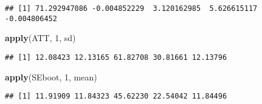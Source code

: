 \documentclass[]{article}
\newenvironment{Shaded}{\begin{snugshade}}{\end{snugshade}}
\newcommand{\KeywordTok}[1]{\textcolor[rgb]{0.13,0.29,0.53}{\textbf{#1}}}
\newcommand{\DecValTok}[1]{\textcolor[rgb]{0.00,0.00,0.81}{#1}}
\newcommand{\NormalTok}[1]{#1}
\begin{document}
\begin{verbatim}
## [1] 71.292947086 -0.004852229  3.120162985  5.626615117 -0.004806452
\end{verbatim}

\begin{Shaded}
\begin{Highlighting}[]
\KeywordTok{apply}\NormalTok{(ATT, }\DecValTok{1}\NormalTok{, sd)}
\end{Highlighting}
\end{Shaded}

\begin{verbatim}
## [1] 12.08423 12.13165 61.82708 30.81661 12.13796
\end{verbatim}

\begin{Shaded}
\begin{Highlighting}[]
\KeywordTok{apply}\NormalTok{(SEboot, }\DecValTok{1}\NormalTok{, mean)}
\end{Highlighting}
\end{Shaded}

\begin{verbatim}
## [1] 11.91909 11.84323 45.62230 22.54042 11.84496
\end{verbatim}
\end{document}
